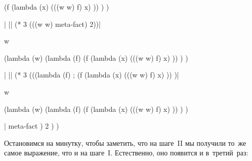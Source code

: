 \begin{code:lisp}
\begin{where}
\begin{complex}
\begin{where}
\begin{complex*}{4.8cm}
                                                                       \-    (f (lambda (x)
                                                                       \-         (((w w) f) x) )) )  )
                                                                       \end{complex*}
                                                                      \end{where}
                                  \end{complex}
                        \end{where}|
|\Equals|   (* 3 (((w w) meta-fact) 2))|\begin{where}
                                        \- w {\eq} \begin{complex}
                                                  \-(lambda (w)
                                                  \-  (lambda (f)
                                                  \-    (f (lambda (x)
                                                  \-         (((w w) f) x) )) ) )
                                                  \end{complex}
                                        \end{where}|
|\Equals|   (* 3 (((lambda (f)           ; 
            (f (lambda (x)
                 (((w w) f) x) )) )|\begin{where}
                                    \- w {\eq} \begin{complex}
                                              \-(lambda (w)
                                              \-  (lambda (f)
                                              \-    (f (lambda (x)
                                              \-         (((w w) f) x) )) ) )
                                              \end{complex}
                                    \end{where}|
          meta-fact )
         2 ) )
\end{code:lisp}

Остановимся на минутку, чтобы заметить, что на шаге~II мы получили то~же самое
выражение, что и на шаге~I. Естественно, оно появится и в~третий~раз:

